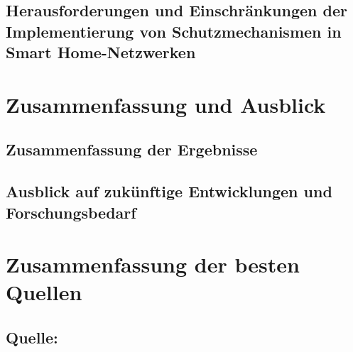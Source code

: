 \subsection{Herausforderungen und Einschränkungen der Implementierung von Schutzmechanismen in Smart Home-Netzwerken}

\newpage
\section{Zusammenfassung und Ausblick}

\subsection{Zusammenfassung der Ergebnisse}
\subsection{Ausblick auf zukünftige Entwicklungen und Forschungsbedarf}

\newpage

\section{Zusammenfassung der besten Quellen}
\subsection{Quelle: \cite{khatoun2022cybersecurity}} 
    
\newpage

    \nocite{*}
    



